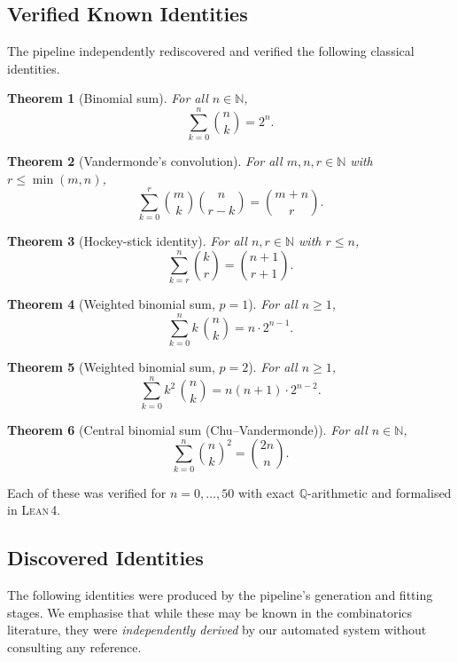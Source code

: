 \documentclass[11pt,a4paper]{article}
\newtheorem{theorem}{Theorem}[section]
\theoremstyle{definition}
\theoremstyle{remark}
\newcommand{\N}{\mathbb{N}}
\newcommand{\Q}{\mathbb{Q}}
\newcommand{\lean}{\textsc{Lean\,4}}
\begin{document}
\subsection{Verified Known Identities}\label{sec:known}

The pipeline independently rediscovered and verified the following
classical identities.

\begin{theorem}[Binomial sum]\label{thm:binsum}
For all $n\in\N$,
\[
  \sum_{k=0}^{n}\binom{n}{k} = 2^n.
\]
\end{theorem}

\begin{theorem}[Vandermonde's convolution]\label{thm:vandermonde}
For all $m,n,r\in\N$ with $r\le\min(m,n)$,
\[
  \sum_{k=0}^{r}\binom{m}{k}\binom{n}{r-k} = \binom{m+n}{r}.
\]
\end{theorem}

\begin{theorem}[Hockey-stick identity]\label{thm:hockey}
For all $n,r\in\N$ with $r\le n$,
\[
  \sum_{k=r}^{n}\binom{k}{r} = \binom{n+1}{r+1}.
\]
\end{theorem}

\begin{theorem}[Weighted binomial sum, $p=1$]\label{thm:weighted1}
For all $n\ge 1$,
\[
  \sum_{k=0}^{n}k\,\binom{n}{k} = n\cdot 2^{n-1}.
\]
\end{theorem}

\begin{theorem}[Weighted binomial sum, $p=2$]\label{thm:weighted2}
For all $n\ge 1$,
\[
  \sum_{k=0}^{n}k^2\,\binom{n}{k} = n(n+1)\cdot 2^{n-2}.
\]
\end{theorem}

\begin{theorem}[Central binomial sum (Chu--Vandermonde)]\label{thm:central}
For all $n\in\N$,
\[
  \sum_{k=0}^{n}\binom{n}{k}^2 = \binom{2n}{n}.
\]
\end{theorem}

Each of these was verified for $n=0,\dots,50$ with exact $\Q$-arithmetic
and formalised in \lean{}.

\subsection{Discovered Identities}\label{sec:discovered}

The following identities were produced by the pipeline's generation
and fitting stages.  We emphasise that while these may be known in
the combinatorics literature, they were \emph{independently derived}
by our automated system without consulting any reference.
\end{document}
